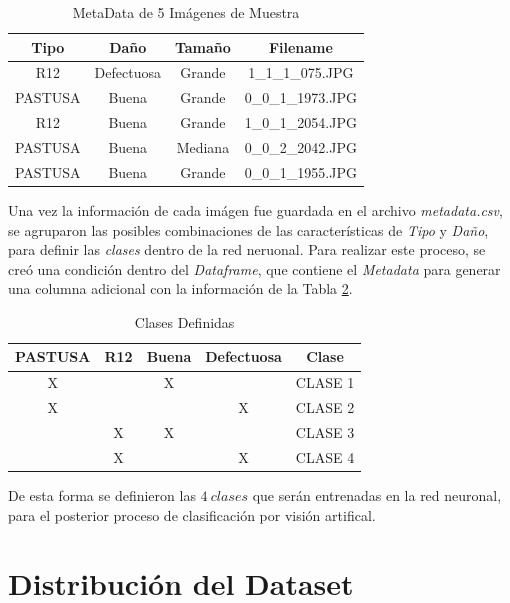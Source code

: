 	\begin{table}[ht]
		\centering
		\begin{tabular}{|c|c|c|c|}
			\hline
			Tipo & Daño & Tamaño & Filename \\
			\hline
			R12 & Defectuosa & Grande & 1\_1\_1\_075.JPG \\
			\hline
			PASTUSA & Buena & Grande & 0\_0\_1\_1973.JPG \\
			\hline
			R12 & Buena & Grande & 1\_0\_1\_2054.JPG \\
			\hline
			PASTUSA & Buena & Mediana & 0\_0\_2\_2042.JPG \\
			\hline
			PASTUSA & Buena & Grande & 0\_0\_1\_1955.JPG \\
			\hline
		\end{tabular}	
		\caption{MetaData de 5 Imágenes de Muestra}
		\label{table:metadata}
	\end{table}


	Una vez la información de cada imágen fue guardada en el archivo \textit{metadata.csv}, se agruparon las posibles combinaciones de las características de \textit{Tipo} y \textit{Daño}, para definir las \textit{clases} dentro de la red neruonal. Para realizar este proceso, se creó una condición dentro del \textit{Dataframe}, que contiene el \textit{Metadata} para generar una columna adicional con la información de la Tabla \ref{table:Clases}.	
	
	\begin{table}[ht]
		\centering
		\begin{tabular}{|c|c|c|c|c|}
			\hline
			PASTUSA & R12 & Buena & Defectuosa & Clase \\
			\hline
			X &  & X &  & CLASE 1 \\
			\hline
			X &  &  & X & CLASE 2 \\
			\hline
			& X & X &  & CLASE 3 \\
			\hline
			& X &  & X & CLASE 4 \\
			\hline
		\end{tabular}	
		\caption{Clases Definidas}
		\label{table:Clases}
	\end{table}	

De esta forma se definieron las $4 \ clases$ que serán entrenadas en la red neuronal, para el posterior proceso de clasificación por visión artifical. 


\newpage
\section{Distribución del Dataset}
	  
